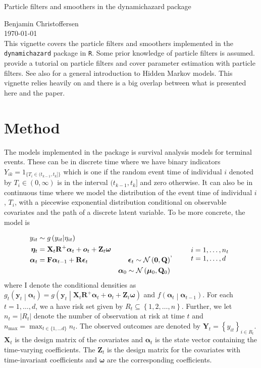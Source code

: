\documentclass[notitlepage]{article}
\renewcommand{\vec}[1]{\bm{#1}}
\newcommand{\mat}[1]{\mathbf{#1}}
\newcommand{\Lbrace}[1]{\left\{ #1\right\}}
\newcommand{\Lparen}[1]{\left( #1\right)}
\newcommand{\Cond}[2]{ #1 \middle\vert  #2}
\newcommand{\optor}[2]{#1\Lparen{#2}}
\newcommand{\optorC}[3]{\optor{#1}{\Cond{#2}{#3}}}
\newcommand{\normal}[2]{\optor{\mathcal{N}}{#1,#2}}
\newcommand{\nPeriods}{d}
\newcommand{\nMax}{n_{\text{max}}}
\newcommand*{\myTitle}{\begingroup
\centering
{\LARGE Particle filters and smoothers in the dynamichazard package} \\[\baselineskip]
\scshape

Benjamin Christoffersen \\[\baselineskip]
\today \\[\baselineskip]
\vspace*{3\baselineskip}
\endgroup}
\begin{document}
\myTitle
This vignette covers the particle filters and smoothers implemented in the \texttt{dynamichazard} package in \texttt{R}. Some prior knowledge of particle filters is assumed.  \cite{doucet09} provide a tutorial 
on particle filters and \cite{kantas15} cover parameter estimation with particle filters. 
See also \cite{cappe05} for a general introduction to Hidden Markov models. 
This vignette relies heavily on \cite{fearnhead10} and there is a big overlap between what
is presented here and the paper. 

\section{Method}
The models implemented in the package is survival analysis models for terminal
events. These can be in discrete time where we have binary indicators
$Y_{ik} = 1_{\{T_i \in (t_{k-1}, t_k]\}}$ which is one if the random event time
of individual $i$ denoted by 
$T_i\in (0,\infty)$ is in the interval $(t_{k-1}, t_k]$ and zero otherwise.
It can also be in continuous time where we model the distribution of the event 
time of individual $i$, $T_i$, with a
piecewise exponential distribution conditional on observable covariates 
and the path of a discrete latent variable. To be more concrete, the model is

\begin{equation}\label{eqn:model}
\begin{aligned}
 	y_{it} &\sim \optorC{g}{y_{it}}{\eta_{it}} &  \\
%
 	\vec{\eta}_{t} &= \mat{X}_t\mat R^+\vec{\alpha}_t + \vec{o}_t +  
 	\mat{Z}_t\vec{\omega} & \\
%
 	\vec{\alpha}_t &= \mat{F}\vec{\alpha}_{t - 1} + \mat{R}\vec{\epsilon}_t&
 		\vec{\epsilon}_t \sim \normal{\vec 0}{\mat Q} \\
%
	& \vphantom{a} &	\vec{\alpha}_0 \sim \normal{\vec\mu_0}{\mat{Q}_0}
\end{aligned}, \qquad
%
\begin{array}{l} i = 1, \dots, n_t \\ t = 1, \dots, d \end{array}
\end{equation}%
%
where I  denote the conditional densities as %
$\optorC{g_t}{\vec{y}_t}{\vec{\alpha}_t} = %
	\optorC{g}{\vec{y}_t}{\mat{X}_t\mat R^+\vec{\alpha}_t + \vec{o}_t +  \mat{Z}_t\vec{\omega}}$ and $\optorC{f}{\vec{\alpha}_t}{\vec{\alpha}_{t-1}}$. 
For each $t=1,\dots,\nPeriods$, we a have risk set given by $R_t \subseteq \Lbrace{1,2,\dots,n}$. 
Further, we let $n_t = \vert R_t \vert$ denote the number of observation 
at risk at time $t$ 
and $\nMax = \max_{t \in\{1,\dots \nPeriods\}} n_t$. The observed outcomes 
are denoted by $\vec Y_t = \Lbrace{y_{it}}_{i \in R_t}$. $\mat{X}_t$ is the 
design matrix of the covariates and $\vec{\alpha}_t$ is the state vector 
containing the time-varying coefficients. 
The $\mat{Z}_t$ is the design matrix for the covariates with time-invariant
coefficients and $\vec{\omega}$ are the corresponding coefficients.
\end{document}
